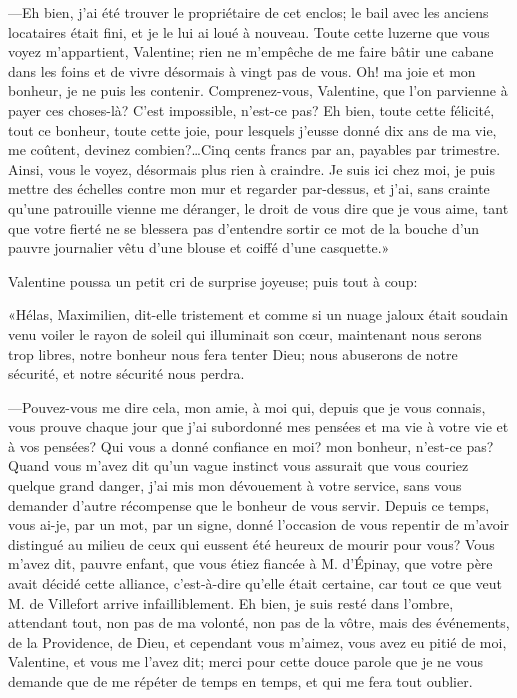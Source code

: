 —Eh bien, j'ai été trouver le propriétaire de cet enclos; le bail avec les anciens locataires était fini, et je le lui ai loué à nouveau. Toute cette luzerne que vous voyez m'appartient, Valentine; rien ne m'empêche de me faire bâtir une cabane dans les foins et de vivre désormais à vingt pas de vous. Oh! ma joie et mon bonheur, je ne puis les contenir. Comprenez-vous, Valentine, que l'on parvienne à payer ces choses-là? C'est impossible, n'est-ce pas? Eh bien, toute cette félicité, tout ce bonheur, toute cette joie, pour lesquels j'eusse donné dix ans de ma vie, me coûtent, devinez combien?\dots Cinq cents francs par an, payables par trimestre. Ainsi, vous le voyez, désormais plus rien à craindre. Je suis ici chez moi, je puis mettre des échelles contre mon mur et regarder par-dessus, et j'ai, sans crainte qu'une patrouille vienne me déranger, le droit de vous dire que je vous aime, tant que votre fierté ne se blessera pas d'entendre sortir ce mot de la bouche d'un pauvre journalier vêtu d'une blouse et coiffé d'une casquette.» 

Valentine poussa un petit cri de surprise joyeuse; puis tout à coup: 

«Hélas, Maximilien, dit-elle tristement et comme si un nuage jaloux était soudain venu voiler le rayon de soleil qui illuminait son cœur, maintenant nous serons trop libres, notre bonheur nous fera tenter Dieu; nous abuserons de notre sécurité, et notre sécurité nous perdra. 

—Pouvez-vous me dire cela, mon amie, à moi qui, depuis que je vous connais, vous prouve chaque jour que j'ai subordonné mes pensées et ma vie à votre vie et à vos pensées? Qui vous a donné confiance en moi? mon bonheur, n'est-ce pas? Quand vous m'avez dit qu'un vague instinct vous assurait que vous couriez quelque grand danger, j'ai mis mon dévouement à votre service, sans vous demander d'autre récompense que le bonheur de vous servir. Depuis ce temps, vous ai-je, par un mot, par un signe, donné l'occasion de vous repentir de m'avoir distingué au milieu de ceux qui eussent été heureux de mourir pour vous? Vous m'avez dit, pauvre enfant, que vous étiez fiancée à M. d'Épinay, que votre père avait décidé cette alliance, c'est-à-dire qu'elle était certaine, car tout ce que veut M. de Villefort arrive infailliblement. Eh bien, je suis resté dans l'ombre, attendant tout, non pas de ma volonté, non pas de la vôtre, mais des événements, de la Providence, de Dieu, et cependant vous m'aimez, vous avez eu pitié de moi, Valentine, et vous me l'avez dit; merci pour cette douce parole que je ne vous demande que de me répéter de temps en temps, et qui me fera tout oublier. 

